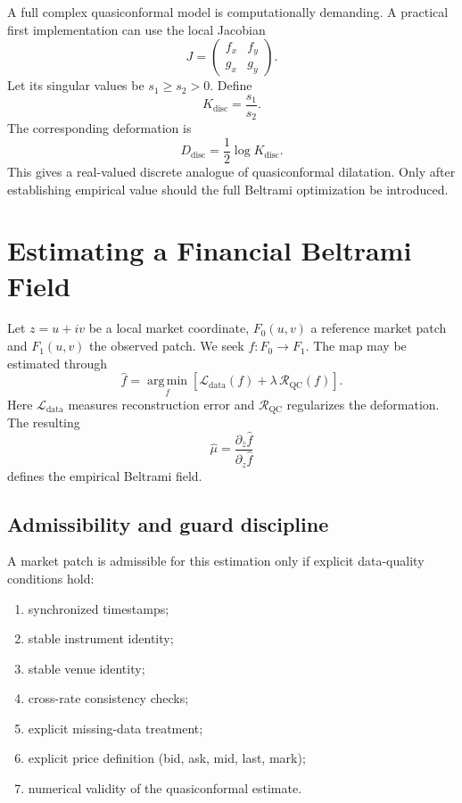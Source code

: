 \documentclass[11pt,a4paper]{article}
\numberwithin{equation}{section}
\newcommand{\argmin}{\operatorname*{arg\,min}}
\begin{document}
A full complex quasiconformal model is computationally demanding. A
practical first implementation can use the local Jacobian
\[
J=
\begin{pmatrix}
f_x&f_y\\
g_x&g_y
\end{pmatrix}.
\]
Let its singular values be $s_1\geq s_2>0$. Define
\begin{equation}
K_{\mathrm{disc}}=\frac{s_1}{s_2}.
\label{eq:Kdisc}
\end{equation}
The corresponding deformation is
\begin{equation}
D_{\mathrm{disc}}=\frac12\log K_{\mathrm{disc}}.
\label{eq:Ddisc}
\end{equation}
This gives a real-valued discrete analogue of quasiconformal
dilatation. Only after establishing empirical value should the full
Beltrami optimization be introduced.

\section{Estimating a Financial Beltrami Field}\label{sec:estimation}

Let $z=u+iv$ be a local market coordinate, $F_0(u,v)$ a reference
market patch and $F_1(u,v)$ the observed patch. We seek
$f:F_0\rightarrow F_1$. The map may be estimated through
\begin{equation}
\hat f=\argmin_f
\left[
\mathcal{L}_{\mathrm{data}}(f)+\lambda\,\mathcal{R}_{\mathrm{QC}}(f)
\right].
\label{eq:beltrami_opt}
\end{equation}
Here $\mathcal{L}_{\mathrm{data}}$ measures reconstruction error and
$\mathcal{R}_{\mathrm{QC}}$ regularizes the deformation. The
resulting
\begin{equation}
\hat\mu=\frac{\partial_{\bar z}\hat f}{\partial_z\hat f}
\end{equation}
defines the empirical Beltrami field.

\subsection*{Admissibility and guard discipline}

A market patch is admissible for this estimation only if explicit
data-quality conditions hold:
\begin{enumerate}
\item synchronized timestamps;
\item stable instrument identity;
\item stable venue identity;
\item cross-rate consistency checks;
\item explicit missing-data treatment;
\item explicit price definition (bid, ask, mid, last, mark);
\item numerical validity of the quasiconformal estimate.
\end{enumerate}
\end{document}
